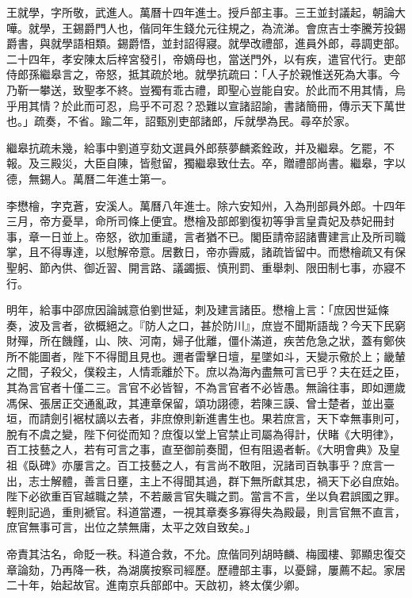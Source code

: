 \begin{pinyinscope}
王就學，字所敬，武進人。萬曆十四年進士。授戶部主事。三王並封議起，朝論大嘩。就學，王錫爵門人也，偕同年生錢允元往規之，為流涕。會庶吉士李騰芳投錫爵書，與就學語相類。錫爵悟，並封詔得寢。就學改禮部，進員外郎，尋調吏部。二十四年，孝安陳太后梓宮發引，帝嫡母也，當送門外，以有疾，遣官代行。吏部侍郎孫繼皋言之，帝怒，抵其疏於地。就學抗疏曰：「人子於親惟送死為大事。今乃靳一攀送，致聖孝不終。豈獨有乖古禮，即聖心豈能自安。於此而不用其情，烏乎用其情？於此而可忍，烏乎不可忍？恐難以宣諸詔諭，書諸簡冊，傳示天下萬世也。」疏奏，不省。踰二年，詔甄別吏部諸郎，斥就學為民。尋卒於家。

繼皋抗疏未幾，給事中劉道亨劾文選員外郎蔡夢麟紊銓政，并及繼皋。乞罷，不報。及三殿災，大臣自陳，皆慰留，獨繼皋致仕去。卒，贈禮部尚書。繼皋，字以德，無錫人。萬曆二年進士第一。

李懋檜，字克蒼，安溪人。萬曆八年進士。除六安知州，入為刑部員外郎。十四年三月，帝方憂旱，命所司條上便宜。懋檜及部郎劉復初等爭言皇貴妃及恭妃冊封事，章一日並上。帝怒，欲加重譴，言者猶不已。閣臣請帝詔諸曹建言止及所司職掌，且不得專達，以慰解帝意。居數日，帝亦霽威，諸疏皆留中。而懋檜疏又有保聖躬、節內供、御近習、開言路、議蠲振、慎刑罰、重舉刺、限田制七事，亦寢不行。

明年，給事中邵庶因論誠意伯劉世延，刺及建言諸臣。懋檜上言：「庶因世延條奏，波及言者，欲概絕之。『防人之口，甚於防川』，庶豈不聞斯語哉？今天下民窮財殫，所在饑饉，山、陜、河南，婦子仳離，僵仆滿道，疾苦危急之狀，蓋有鄭俠所不能圖者，陛下不得聞且見也。邇者雷擊日壇，星墜如斗，天變示儆於上；畿輦之間，子殺父，僕殺主，人情乖離於下。庶以為海內盡無可言已乎？夫在廷之臣，其為言官者十僅二三。言官不必皆智，不為言官者不必皆愚。無論往事，即如邇歲馮保、張居正交通亂政，其連章保留，頌功詡德，若陳三謨、曾士楚者，並出臺垣，而請劍引裾杖謫以去者，非庶僚則新進書生也。果若庶言，天下幸無事則可，脫有不虞之變，陛下何從而知？庶復以堂上官禁止司屬為得計，伏睹《大明律》，百工技藝之人，若有可言之事，直至御前奏聞，但有阻遏者斬。《大明會典》及皇祖《臥碑》亦屢言之。百工技藝之人，有言尚不敢阻，況諸司百執事乎？庶言一出，志士解體，善言日壅，主上不得聞其過，群下無所獻其忠，禍天下必自庶始。陛下必欲重百官越職之禁，不若嚴言官失職之罰。當言不言，坐以負君誤國之罪。輕則記過，重則褫官。科道當遷，一視其章奏多寡得失為殿最，則言官無不直言，庶官無事可言，出位之禁無庸，太平之效自致矣。」

帝責其沽名，命貶一秩。科道合救，不允。庶偕同列胡時麟、梅國樓、郭顯忠復交章論劾，乃再降一秩，為湖廣按察司經歷。歷禮部主事，以憂歸，屢薦不起。家居二十年，始起故官。進南京兵部郎中。天啟初，終太僕少卿。


\end{pinyinscope}
